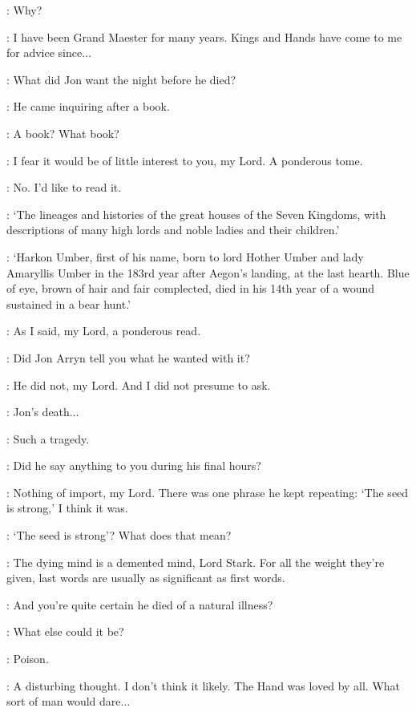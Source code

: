 \NED: Why? 

\PYCELLE: I have been Grand Maester for many years. Kings and Hands have come to me for advice since$\ldots$ 

\NED: What did Jon want the night before he died? 

\PYCELLE: He came inquiring after a book. 

\NED: A book? What book? 

\PYCELLE: I fear it would be of little interest to you, my Lord. A ponderous tome. 

\NED: No. I'd like to read it. 


\PYCELLE: `The lineages and histories of the great houses of the Seven Kingdoms, with descriptions of many high lords and noble ladies and their children.'

\NED: `Harkon Umber, first of his name, born to lord Hother Umber and lady Amaryllis Umber in the 183rd year after Aegon's landing, at the last hearth. Blue of eye, brown of hair and fair complected, died in his 14th year of a wound sustained in a bear hunt.'

\PYCELLE: As I said, my Lord, a ponderous read. 

\NED: Did Jon Arryn tell you what he wanted with it? 

\PYCELLE: He did not, my Lord. And I did not presume to ask. 

\NED: Jon's death$\ldots$ 

\PYCELLE: Such a tragedy. 

\NED: Did he say anything to you during his final hours? 

\PYCELLE: Nothing of import, my Lord. There was one phrase he kept repeating: `The seed is strong,' I think it was. 

\NED: `The seed is strong'? What does that mean? 

\PYCELLE: The dying mind is a demented mind, Lord Stark. For all the weight they're given, last words are usually as significant as first words. 

\NED: And you're quite certain he died of a natural illness? 

\PYCELLE: What else could it be? 

\NED: Poison. 

\PYCELLE: A disturbing thought. I don't think it likely. The Hand was loved by all. What sort of man would dare$\ldots$ 

